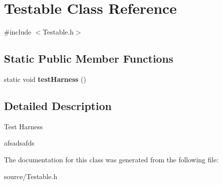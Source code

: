\hypertarget{classTestable}{}\section{Testable Class Reference}
\label{classTestable}


{\ttfamily \#include $<$Testable.\+h$>$}

\subsection*{Static Public Member Functions}
\begin{DoxyCompactItemize}
\item 
\mbox{\label{classTestable_a069adaac3d74cfcec05397bfd63bd33b}} 
static void {\bfseries test\+Harness} ()
\end{DoxyCompactItemize}


\subsection{Detailed Description}
Test Harness

afsadsafds 

The documentation for this class was generated from the following file\+:\begin{DoxyCompactItemize}
\item 
source/Testable.\+h\end{DoxyCompactItemize}
